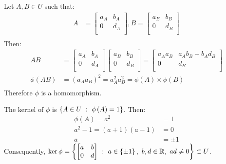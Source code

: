 \documentclass{article}
\begin{document}
Let $A, B \in U$ such that:
\begin{equation}
    \begin{split}
        A & = \begin{bmatrix}
            a_A & b_A \\ 0 & d_A \\
        \end{bmatrix}, B = \begin{bmatrix}
            a_B & b_B \\ 0 & d_B \\
        \end{bmatrix} \\
    \end{split}
\end{equation}
Then:
\begin{equation}
    \begin{split}
        AB & = \begin{bmatrix}
            a_A & b_A \\ 0 & d_A \\
        \end{bmatrix}\begin{bmatrix}
            a_B & b_B \\ 0 & d_B \\
        \end{bmatrix} = \begin{bmatrix}
            a_Aa_B & a_Ab_B + b_Ad_B \\ 0 & d_B \\
        \end{bmatrix} \\
        \phi\left(AB\right) & = \left(a_Aa_B\right)^2 = a_A^2a_B^2 = \phi\left(A\right) \times \phi\left(B\right) \\
    \end{split}
\end{equation}
Therefore $\phi$ is a homomorphism.

The kernel of $\phi$ is $\left\{A \in U \ : \  \phi\left(A\right) = 1\right\}$. Then:
\begin{equation}
    \begin{split}
        \phi\left(A\right) = a^2 & = 1 \\
        a^2 - 1 = \left(a + 1\right)\left(a - 1\right) & = 0 \\
        a & = \pm 1
    \end{split}
\end{equation}
Consequently, $\ker\phi = \left\{
\begin{bmatrix}
    a & b \\ 0 & d 
\end{bmatrix} 
\ : \  a \in \left\{\pm 1\right\}, \ b,d \in \mathbb{R}, \ ad \neq 0
\right\} \subset U$.
\end{document}
